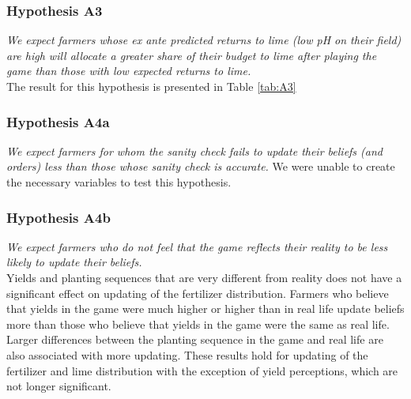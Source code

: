 \documentclass[12pt,letterpaper]{article}
\begin{document}




\newpage
\subsubsection*{Hypothesis A3}
\textit{We expect farmers whose ex ante predicted returns to lime (low pH on their field) are high will allocate a greater share of their budget to lime after playing the game than those with low expected returns to lime.}\\
The result for this hypothesis is presented in Table \ref{tab:A3}

\subsubsection*{Hypothesis A4a}
\textit{We expect farmers for whom the sanity check fails to update their beliefs (and orders) less than those whose sanity check is accurate.}
\noindent We were unable to create the necessary variables to test this hypothesis.

\newpage
\subsubsection*{Hypothesis A4b}
\textit{We expect farmers who do not feel that the game reflects their reality to be less likely to update their beliefs.}\\
Yields and planting sequences that are very different from reality does not have a significant effect on updating of the fertilizer distribution. Farmers who believe that yields in the game were much higher or higher than in real life update beliefs more than those who believe that yields in the game were the same as real life. Larger differences between the planting sequence in the game and real life are also associated with more updating. These results hold for updating of the fertilizer and lime distribution with the exception of yield perceptions, which are not longer significant. 

\begin{comment}
We also look at how perception of the accuracy of the game affect the farmers' orders. We see no effect on DAP or lime orders. We do see significant changes in the absolute value of the percent change in the order value of can for farmers who perceive the planting sequence to be slightly different and very different. 
\end{comment}
\end{document}
